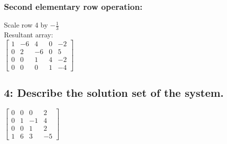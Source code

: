 \documentclass{article}
\begin{document}
\subsubsection*{Second elementary row operation:}
Scale row 4 by $-\frac{1}{3}$
\\ Resultant array: \\
$\left[\begin{array}{cccc|c}
1 & -6 & 4 & 0 & -2 \\
0 & 2 & -6 & 0 & 5 \\ 
0 & 0 & 1 & 4 & -2 \\ 
0 & 0 & 0 & 1 & -4
\end{array}\right] 
$
\pagebreak
\subsection*{4: Describe the solution set of the system.}
$\left[\begin{array}{ccc|c}
0 & 0 & 0 & 2 \\
0 & 1 & -1 & 4 \\ 
0 & 0 & 1 & 2 \\ 
1 & 6 & 3 & -5
\end{array}\right] 
$\\
\end{document}
